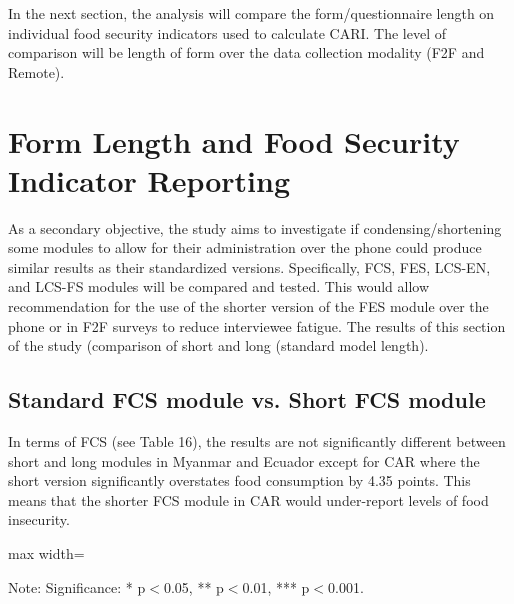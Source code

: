\documentclass[11pt,harvard]{article}
\begin{document}
In the next section, the analysis will compare the form/questionnaire length on individual food security indicators used to calculate CARI. The level of comparison will be length of form over the data collection modality (F2F and Remote).

\pagebreak
	
\section{Form Length and Food Security Indicator Reporting}

As a secondary objective, the study aims to investigate if condensing/shortening some modules to allow for their administration over the phone could produce similar results as their standardized versions. Specifically, FCS, FES, LCS-EN, and LCS-FS modules will be compared and tested. This would allow recommendation for the use of the shorter version of the FES module over the phone or in F2F surveys to reduce interviewee fatigue. The results of this section of the study (comparison of short and long (standard model length). 

\subsection{Standard FCS module vs. Short FCS module}

In terms of FCS (see Table 16), the results are not significantly different between short and long modules in Myanmar and Ecuador except for CAR where the short version significantly overstates food consumption by 4.35 points. This means that the shorter FCS module in CAR would under-report levels of food insecurity.

\begin{table}[htbp]
	\centering
	\begin{adjustbox}{max width=\textwidth}
		\begin{threeparttable}
			\caption{Impact of Module Length on FCS Reporting}
			\scriptsize
			 
			\label{tab:FCS_F2F_Form_Length_All_Country}
			\begin{tablenotes}
				\item Note: Significance: * p$<$0.05, ** p$<$0.01, *** p$<$0.001. 
			\end{tablenotes}
		\end{threeparttable}
	\end{adjustbox}
\end{table}
\end{document}
